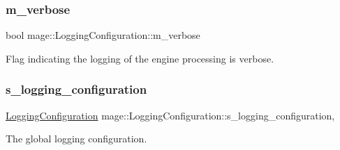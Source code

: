 \subsubsection{\texorpdfstring{m\+\_\+verbose}{m\_verbose}}
{\footnotesize\ttfamily bool mage\+::\+Logging\+Configuration\+::m\+\_\+verbose\hspace{0.3cm}{\ttfamily [private]}}

Flag indicating the logging of the engine processing is verbose. \hypertarget{classmage_1_1_logging_configuration_a056b2250472f997de3d99dcfc3c02940}{}\label{classmage_1_1_logging_configuration_a056b2250472f997de3d99dcfc3c02940} 
\subsubsection{\texorpdfstring{s\+\_\+logging\+\_\+configuration}{s\_logging\_configuration}}
{\footnotesize\ttfamily \hyperlink{classmage_1_1_logging_configuration}{Logging\+Configuration} mage\+::\+Logging\+Configuration\+::s\+\_\+logging\+\_\+configuration\hspace{0.3cm}{\ttfamily [static]}, {\ttfamily [private]}}

The global logging configuration. 